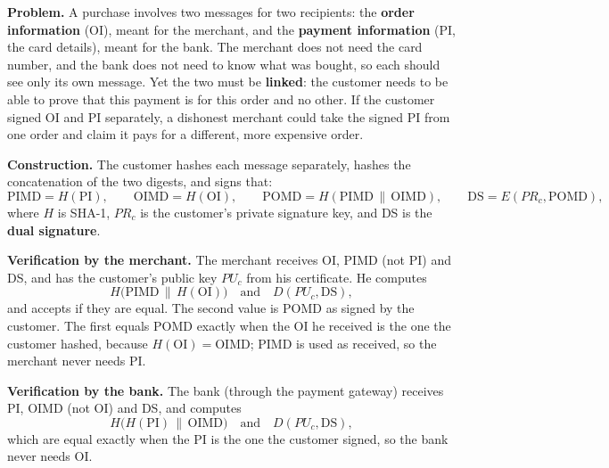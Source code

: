 \textbf{Problem.} A purchase involves two messages for two recipients: the \textbf{order information} (OI), meant for the merchant, and the \textbf{payment information} (PI, the card details), meant for the bank. The merchant does not need the card number, and the bank does not need to know what was bought, so each should see only its own message. Yet the two must be \textbf{linked}: the customer needs to be able to prove that this payment is for this order and no other. If the customer signed OI and PI separately, a dishonest merchant could take the signed PI from one order and claim it pays for a different, more expensive order.

\textbf{Construction.} The customer hashes each message separately, hashes the concatenation of the two digests, and signs that:
\[
\mathrm{PIMD} = H(\mathrm{PI}), \qquad \mathrm{OIMD} = H(\mathrm{OI}), \qquad \mathrm{POMD} = H(\mathrm{PIMD} \,\|\, \mathrm{OIMD}), \qquad \mathrm{DS} = E(PR_c, \mathrm{POMD}),
\]
where $H$ is SHA-1, $PR_c$ is the customer's private signature key, and DS is the \textbf{dual signature}.
\begin{center}
\end{center}

\textbf{Verification by the merchant.} The merchant receives OI, PIMD (not PI) and DS, and has the customer's public key $PU_c$ from his certificate. He computes
\[
H\big(\mathrm{PIMD} \,\|\, H(\mathrm{OI})\big) \quad\text{and}\quad D(PU_c, \mathrm{DS}),
\]
and accepts if they are equal. The second value is POMD as signed by the customer. The first equals POMD exactly when the OI he received is the one the customer hashed, because $H(\mathrm{OI}) = \mathrm{OIMD}$; PIMD is used as received, so the merchant never needs PI.

\textbf{Verification by the bank.} The bank (through the payment gateway) receives PI, OIMD (not OI) and DS, and computes
\[
H\big(H(\mathrm{PI}) \,\|\, \mathrm{OIMD}\big) \quad\text{and}\quad D(PU_c, \mathrm{DS}),
\]
which are equal exactly when the PI is the one the customer signed, so the bank never needs OI.

